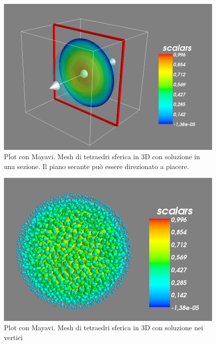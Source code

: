 \documentclass[oneside,12pt]{book}  %
\theoremstyle{plain}
\theoremstyle{definition}
\theoremstyle{remark}
\numberwithin{equation}{chapter} %
\begin{document}
\begin{figure}[h]
\label{img:matplotlibMesh}
\centering
\includegraphics[scale=0.4]{Immagini/Project/mayavi3D.png}
\caption{Plot con Mayavi. Mesh di tetraedri sferica in 3D con
  soluzione in una sezione. Il piano secante pu\`o essere direzionato
  a piacere.}
\end{figure}

\begin{figure}[h]
\label{img:matplotlibMesh}
\centering
\includegraphics[scale=0.4]{Immagini/Project/mayavi3DPoints.png}
\caption{Plot con Mayavi. Mesh di tetraedri sferica in 3D con
  soluzione nei vertici}
\end{figure}

\end{document}
